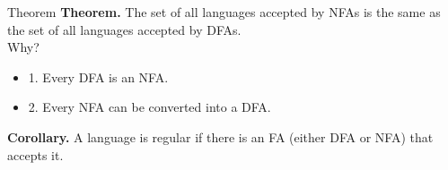 \documentclass[10pt]{beamer}
\begin{document}
\begin{frame}{Theorem}
    \textbf{Theorem. }The set of all languages accepted by NFAs is the same as the set of all languages accepted by DFAs.\\
    Why?
    \begin{itemize}
        \item 1. Every DFA is an NFA.
        \item 2. Every NFA can be converted into a DFA.
    \end{itemize}
    \textbf{Corollary. }A language is regular if there is an FA (either DFA or NFA) that accepts it.
\end{frame}
\end{document}

